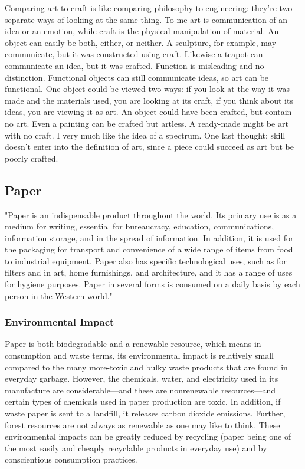 \documentclass[12pt]{article}
\begin{document}
Comparing art to craft is like comparing philosophy to engineering: they're two separate ways of looking at the same thing. To me art is communication of an idea or an emotion, while craft is the physical manipulation of material. An object can easily be both, either, or neither. A sculpture, for example, may communicate, but it was constructed using craft. Likewise a teapot can communicate an idea, but it was crafted. Function is misleading and no distinction. Functional objects can still communicate ideas, so art can be functional. One object could be viewed two ways: if you look at the way it was made and the materials used, you are looking at its craft, if you think about its ideas, you are viewing it as art. An object could have been crafted, but contain no art. Even a painting can be crafted but artless. A ready-made might be art with no craft. I very much like the idea of a spectrum. One last thought: skill doesn't enter into the definition of art, since a piece could succeed as art but be poorly crafted.

\subsection{Paper}
"Paper is an indispensable product throughout the world. Its primary use is as a medium for writing, essential for bureaucracy, education, communications, information storage, and in the spread of information. In addition, it is used for the packaging for transport and convenience of a wide range of items from food to industrial equipment. Paper also has specific technological uses, such as for filters and in art, home furnishings, and architecture, and it has a range of uses for hygiene purposes. Paper in several forms is consumed on a daily basis by each person in the Western world." \cite{trafford2012paper}

%
\subsubsection{Environmental Impact}
Paper is both biodegradable and a renewable resource, which means in consumption and waste terms, its environmental impact is relatively small compared to the many more-toxic and bulky waste products that are found in everyday garbage. However, the chemicals, water, and electricity used in its manufacture are considerable---and these are nonrenewable resources---and certain types of chemicals used in paper production are toxic. In addition, if waste paper is sent to a landfill, it releases carbon dioxide emissions. Further, forest resources are not always as renewable as one may like to think. These environmental impacts can be greatly reduced by recycling (paper being one of the most easily and cheaply recyclable products in everyday use) and by conscientious consumption practices.
\end{document}

